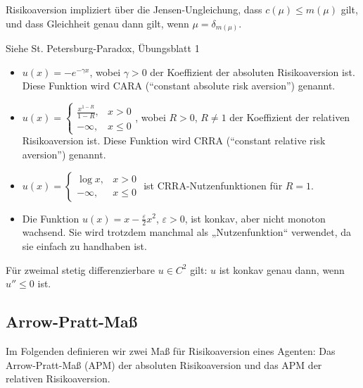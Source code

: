 \documentclass[a4paper,twoside,DIV15,BCOR12mm]{scrbook}
\begin{document}
Risikoaversion impliziert über die Jensen-Ungleichung, dass $c(\mu) \le m(\mu)$ gilt, und dass Gleichheit genau dann gilt, wenn $\mu = \delta_{m(\mu)}$.

\begin{beispiel}
Siehe St. Petersburg-Paradox, Übungsblatt 1
\end{beispiel}

\begin{beispiel}
\begin{itemize}
\item $u(x) = - e^{-\gamma x}$, wobei $\gamma>0$ der Koeffizient der absoluten Risikoaversion ist. Diese Funktion wird CARA (“constant absolute risk aversion”) genannt.
\item $u(x) = 
\begin{cases}
\frac{x^{1-R}}{1-R}, & x > 0 \\
-\infty, & x \le 0
\end{cases}$, wobei $R>0$, $R\ne 1$ der Koeffizient der relativen Risikoaversion ist. Diese Funktion wird CRRA (“constant relative risk aversion”) genannt.
\item $u(x) = 
\begin{cases}
\log x, & x > 0 \\
-\infty, & x \le 0
\end{cases}$ ist CRRA-Nutzenfunktionen für $R=1$.
\item Die Funktion $u(x) = x - \frac\varepsilon2x^2$, $\varepsilon>0$, ist konkav, aber nicht monoton wachsend. Sie wird trotzdem manchmal als „Nutzenfunktion“ verwendet, da sie einfach zu handhaben ist.
\end{itemize}
\end{beispiel}

\begin{bemerkung}
Für zweimal stetig differenzierbare $u\in C^2$ gilt: $u$ ist konkav genau dann, wenn $u''\le 0$ ist.
\end{bemerkung}

\subsection{Arrow-Pratt-Maß}

Im Folgenden definieren wir zwei Maß für Risikoaversion eines Agenten: Das Arrow-Pratt-Maß (APM) der absoluten Risikoaversion und das APM der relativen Risikoaversion.
\end{document}

